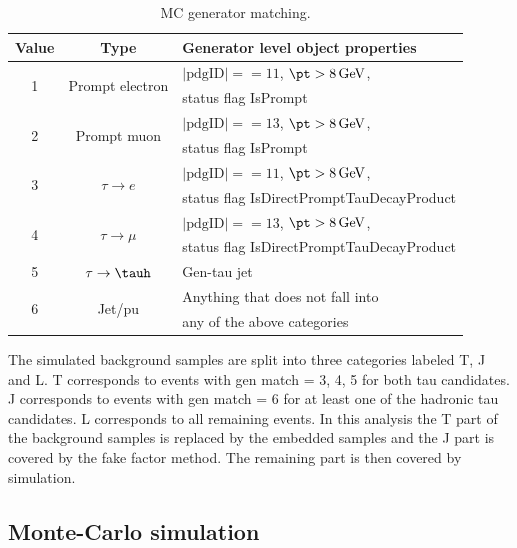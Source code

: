 \begin{table}[]
    \centering
    \caption{MC generator matching.}
    \begin{tabular}{|c|c|l|}
        \hline
        Value & Type & Generator level object properties \\
        \hline
        \multirow{2}{*}{1} & \multirow{2}{*}{Prompt electron} & $|\mathrm{pdgID}|==11$, $\pt > 8 \,\mathrm{GeV}$,\\
         & &  status flag IsPrompt \\
        \hline
        \multirow{2}{*}{2} & \multirow{2}{*}{Prompt muon} & $|\mathrm{pdgID}|==13$, $\pt > 8 \,\mathrm{GeV}$, \\
         & & status flag IsPrompt \\
        \hline
        \multirow{2}{*}{3} & \multirow{2}{*}{$\tau \rightarrow e$} & $|\mathrm{pdgID}|==11$, $\pt > 8 \,\mathrm{GeV}$,\\
         & &  status flag IsDirectPromptTauDecayProduct \\
        \hline
        \multirow{2}{*}{4} & \multirow{2}{*}{$\tau \rightarrow \mu$} & $|\mathrm{pdgID}|==13$, $\pt > 8 \,\mathrm{GeV}$, \\
         & & status flag IsDirectPromptTauDecayProduct \\
        \hline
        \multirow{2}{*}{5} & \multirow{2}{*}{$\tau \rightarrow \tauh$} & \multirow{2}{*}{Gen-tau jet} \\
         & & \\
        \hline
        \multirow{2}{*}{6} & \multirow{2}{*}{Jet/pu} fake & Anything that does not fall into \\
         & &  any of the above categories \\
        \hline
    \end{tabular}
    \label{tab:mc_matching}
\end{table}

The simulated background samples are split into three categories labeled T, J and L. T corresponds to events with gen match = 3, 4, 5 for both tau candidates. J corresponds to events with gen match = 6 for at least one of the hadronic tau candidates. L corresponds to all remaining events. In this analysis the T part of the background samples is replaced by the embedded samples and the J part is covered by the fake factor method. The remaining part is then covered by simulation.


\subsection{Monte-Carlo simulation}
\label{sec:MC_corr}

